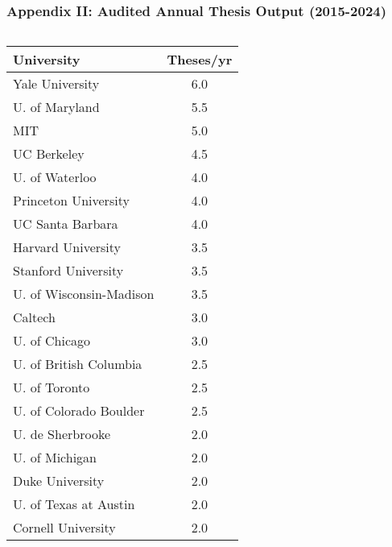 \documentclass[aspectratio=169]{beamer}
\begin{document}
\begin{frame}[fragile]
    \frametitle{Appendix II: Audited Annual Thesis Output (2015-2024)}
    \vspace{-2mm}
    \tiny 
    \begin{columns}[T]
        \begin{column}{0.5\textwidth}
            \begin{tabularx}{\linewidth}{lS[table-format=1.1]}
                \toprule
                \textbf{University} & {\textbf{Theses/yr}} \\
                \midrule
                Yale University & 6.0 \\
                U. of Maryland & 5.5 \\
                MIT & 5.0 \\
                UC Berkeley & 4.5 \\
                U. of Waterloo & 4.0 \\
                Princeton University & 4.0 \\
                UC Santa Barbara & 4.0 \\
                Harvard University & 3.5 \\
                Stanford University & 3.5 \\
                U. of Wisconsin-Madison & 3.5 \\
                Caltech & 3.0 \\
                U. of Chicago & 3.0 \\
                U. of British Columbia & 2.5 \\
                U. of Toronto & 2.5 \\
                U. of Colorado Boulder & 2.5 \\
                U. de Sherbrooke & 2.0 \\
                U. of Michigan & 2.0 \\
                Duke University & 2.0 \\
                U. of Texas at Austin & 2.0 \\
                Cornell University & 2.0 \\
                \bottomrule
            \end{tabularx}
        \end{column}
        \begin{column}{0.5\textwidth}

\end{column}
\end{columns}
\end{frame}
\end{document}

